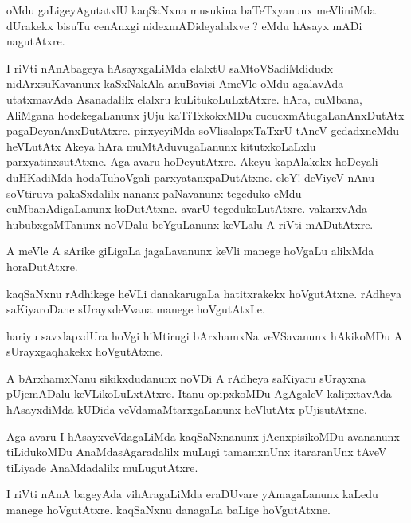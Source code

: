 \documentclass{article}
\begin{document}
\begin{mn}%
oMdu gaLigeyAgutatxlU kaqSaNxna musukina baTeTxyanunx meVliniMda dUrakekx bisuTu cenAnxgi 
nidexmADideyalalxve ? eMdu hAsayx mADi nagutAtxre.
\end{mn}

\begin{mn}%
I riVti nAnAbageya hAsayxgaLiMda elalxtU saMtoVSadiMdidudx nidArxsuKavanunx kaSxNakAla 
anuBavisi AmeVle oMdu agalavAda utatxmavAda Asanadalilx elalxru kuLitukoLuLxtAtxre. hAra, 
cuMbana, AliMgana hodekegaLanunx jUju kaTiTxkokxMDu cucucxmAtugaLanAnxDutAtx 
pagaDeyanAnxDutAtxre. pirxyeyiMda soVlisalapxTaTxrU tAneV gedadxneMdu heVLutAtx Akeya 
hAra muMtAduvugaLanunx kitutxkoLaLxlu parxyatinxsutAtxne. Aga avaru hoDeyutAtxre. Akeyu 
kapAlakekx hoDeyali duHKadiMda hodaTuhoVgali parxyatanxpaDutAtxne. eleY! deViyeV nAnu 
soVtiruva pakaSxdalilx nananx paNavanunx tegeduko eMdu cuMbanAdigaLanunx koDutAtxne. 
avarU tegedukoLutAtxre. vakarxvAda hububxgaMTanunx noVDalu beYguLanunx keVLalu A riVti 
mADutAtxre.
\end{mn}

\begin{mn}%
A meVle A sArike giLigaLa jagaLavanunx keVli manege hoVgaLu alilxMda horaDutAtxre.
\end{mn}

\begin{mn}%
kaqSaNxnu rAdhikege heVLi danakarugaLa hatitxrakekx hoVgutAtxne. rAdheya saKiyaroDane 
sUrayxdeVvana manege hoVgutAtxLe.
\end{mn}

\begin{mn}%
hariyu savxlapxdUra hoVgi hiMtirugi bArxhamxNa veVSavanunx hAkikoMDu A sUrayxgaqhakekx 
hoVgutAtxne.
\end{mn}

\begin{mn}%
A bArxhamxNanu sikikxdudanunx noVDi A rAdheya saKiyaru sUrayxna pUjemADalu 
keVLikoLuLxtAtxre. Itanu opipxkoMDu AgAgaleV kalipxtavAda hAsayxdiMda kUDida 
veVdamaMtarxgaLanunx heVlutAtx pUjisutAtxne.
\end{mn}

\begin{mn}%
Aga avaru I hAsayxveVdagaLiMda kaqSaNxnanunx jAcnxpisikoMDu avananunx tiLidukoMDu 
AnaMdasAgaradalilx muLugi tamamxnUnx itararanUnx tAveV tiLiyade AnaMdadalilx muLugutAtxre.
\end{mn}

\begin{mn}%
I riVti nAnA bageyAda vihAragaLiMda eraDUvare yAmagaLanunx kaLedu manege hoVgutAtxre. 
kaqSaNxnu danagaLa baLige hoVgutAtxne.
\end{mn}
\end{document}
